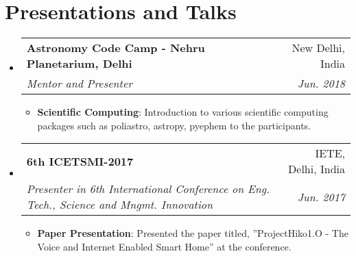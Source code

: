\documentclass[letterpaper,11pt]{article}
\makeatletter
\newcommand{\resumeItem}[2]{
  \item\small{
    \textbf{#1}{: #2 \vspace{-2pt}}
  }
}
\newcommand{\resumeSubheading}[4]{
  \vspace{-1pt}\item
    \begin{tabular*}{0.97\textwidth}{l@{\extracolsep{\fill}}r}
      \textbf{#1} & #2 \\
      \textit{\small#3} & \textit{\small #4} \\
    \end{tabular*}\vspace{-5pt}
}
\newcommand{\resumeSubHeadingListStart}{\begin{itemize}[leftmargin=*]}
\newcommand{\resumeSubHeadingListEnd}{\end{itemize}}
\newcommand{\resumeItemListStart}{\begin{itemize}}
\newcommand{\resumeItemListEnd}{\end{itemize}\vspace{-5pt}}
\makeatother
\begin{document}
\section{Presentations and Talks}
  \resumeSubHeadingListStart

    \resumeSubheading
      {Astronomy Code Camp - Nehru Planetarium, Delhi}{New Delhi, India}
      {Mentor and Presenter}{Jun. 2018}
      \resumeItemListStart
        \resumeItem{Scientific Computing}
          {Introduction to various scientific computing packages such as poliastro, astropy, pyephem to the participants.}
      \resumeItemListEnd

   

    \resumeSubheading
      {6th ICETSMI-2017}{IETE, Delhi, India}
      {Presenter in 6th International Conference on Eng. Tech., Science and Mngmt. Innovation}{Jun. 2017}
      \resumeItemListStart
        \resumeItem{Paper Presentation}
          {Presented the paper titled, ”ProjectHiko1.O - The Voice and Internet Enabled Smart Home” at the conference.}
      \resumeItemListEnd



  \resumeSubHeadingListEnd




\end{document}
